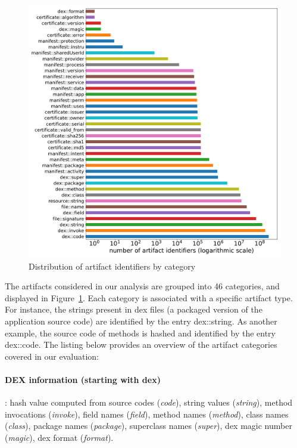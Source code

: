 \begin{figure}[!ht]
        \centering
	\includegraphics[width=\linewidth]{figures/apgraph/families.pdf}
	\caption{Distribution of artifact identifiers by category}
	\label{figure:apgraph:artifacts}
\end{figure}

The artifacts considered in our analysis are grouped into 46 categories, and displayed in Figure~\ref{figure:apgraph:artifacts}.
Each category is associated with a specific artifact type.
For instance, the strings present in dex files (a packaged version of the application source code) are identified by the entry dex::string.
As another example, the source code of methods is hashed and identified by the entry dex::code.
The listing below provides an overview of the artifact categories covered in our evaluation:

\paragraph{DEX information (starting with dex)}: hash value computed from source codes (\textit{code}), string values (\textit{string}), method invocations (\textit{invoke}), field names (\textit{field}), method names (\textit{method}), class names (\textit{class}), package names (\textit{package}), superclass names (\textit{super}), dex magic number (\textit{magic}), dex format (\textit{format}).

